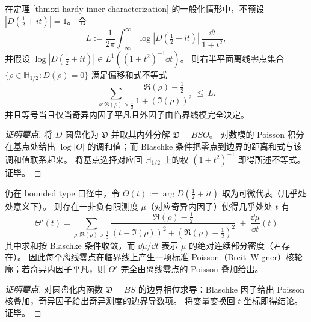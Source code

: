 \begin{proposition}\label{prop:xi-leakage-zero-offset-sum}
在定理 \ref{thm:xi-hardy-inner-characterization} 的一般化情形中，不预设 \(|D(\tfrac12+it)|=1\)。
令
\[
L:=\frac{1}{2\pi}\int_{-\infty}^{\infty}\log |D(\tfrac12+it)|\,\frac{\dd t}{1+t^2},
\]
并假设 \(\log|D(\tfrac12+it)|\in L^1((1+t^2)^{-1}\dd t)\)。
则右半平面离线零点集合 \(\{\rho\in\mathbb{H}_{1/2}:D(\rho)=0\}\) 满足偏移和式不等式
\[
\boxed{\;
\sum_{\rho:\Re(\rho)>\frac12}\frac{\Re(\rho)-\frac12}{1+(\Im(\rho))^2}\ \le\ L.\;}
\]
并且等号当且仅当奇异内因子平凡且外因子由临界线模完全决定。
\end{proposition}
\begin{proof}[证明要点]
将 \(D\) 圆盘化为 \(\mathfrak{D}\) 并取其内外分解 \(\mathfrak{D}=BSO\)。
对数模的 Poisson 积分在基点处给出 \(\log|O|\) 的调和值；而 Blaschke 条件把零点到边界的距离和式与该调和值联系起来。
将基点选择对应回 \(\mathbb{H}_{1/2}\) 上的权 \((1+t^2)^{-1}\) 即得所述不等式。证毕。
\end{proof}

\begin{proposition}\label{prop:xi-phase-derivative-poisson-superposition}
仍在 bounded type 口径中，令 \(\Theta(t):=\arg D(\tfrac12+it)\) 取为可微代表（几乎处处意义下）。
则存在一非负有限测度 \(\mu\)（对应奇异内因子）使得几乎处处 \(t\) 有
\[
\boxed{\;
\Theta'(t)=
\sum_{\rho:\Re(\rho)>\frac12}
\frac{\Re(\rho)-\frac12}{(t-\Im(\rho))^2+(\Re(\rho)-\frac12)^2}
\ +\ \frac{\dd\mu}{\dd t}(t)\;}
\]
其中求和按 Blaschke 条件收敛，而 \(\dd\mu/\dd t\) 表示 \(\mu\) 的绝对连续部分密度（若存在）。
因此每个离线零点在临界线上产生一项标准 Poisson（Breit--Wigner）核轮廓；若奇异内因子平凡，则 \(\Theta'\) 完全由离线零点的 Poisson 叠加给出。
\end{proposition}
\begin{proof}[证明要点]
对圆盘化内函数 \(\mathfrak{D}=BS\) 的边界相位求导：Blaschke 因子给出 Poisson 核叠加，奇异因子给出奇异测度的边界导数项。
将变量变换回 \(t\)-坐标即得结论。证毕。
\end{proof}

